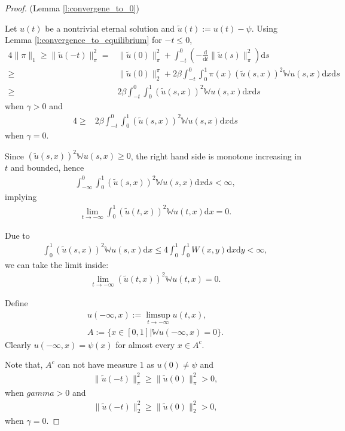\documentclass{article}
\renewcommand{\d}{\mathrm{d}}
\newcommand{\W}{\mathbb{W}}
\newcommand{\1}[1]{{\mathds{1}}_{\left\{#1\right\}}}
\begin{document}
\begin{proof}(Lemma \ref{l:convergene_to_0})
	
	Let $u(t)$ be a nontrivial eternal solution and $\tilde{u}(t):=u(t)-\psi.$ Using Lemma \ref{l:convergence_to_equilibrium} for $-t \leq 0$,
	\begin{align*}
		4 \|\pi \|_1 \geq \| \tilde{u}(-t) \|_{\pi}^2 =&\|\tilde{u}(0) \|_{\pi}^2+\int_{-t}^{0} \left(- \frac{\d}{\d t} \|\tilde{u}(s) \|_{\pi}^2 \right) \d s \\
		\geq &\|\tilde{u}(0) \|_2^{\pi}+2 \beta \int_{-t}^{0}  \int_{0}^{1} \pi(x) \left(\tilde{u}(s,x)\right)^2 \W u(s,x) \d x \d s \\
		\geq & 2 \beta \int_{-t}^{0}  \int_{0}^{1}  \left(\tilde{u}(s,x)\right)^2 \W u(s,x) \d x \d s
	\end{align*}
	when $\gamma>0$ and
	\begin{align*}
		4 \geq & 2 \beta \int_{-t}^{0}  \int_{0}^{1}  \left(\tilde{u}(s,x)\right)^2 \W u(s,x) \d x \d s
	\end{align*}
	when $\gamma=0$.
	
	Since $\left(\tilde{u}(s,x)\right)^2 \W u(s,x) \geq 0$, the right hand side is monotone increasing in $t$ and bounded, hence
	\begin{align*}
		\int_{-\infty}^{0}  \int_{0}^{1} \left(\tilde{u}(s,x)\right)^2 \W u(s,x) \d x \d s<\infty,
	\end{align*}
	implying
	\begin{align*}
		\lim_{t \to -\infty} \int_{0}^{1} \left(\tilde{u}(t,x) \right)^2 \W u(t,x) \d x=0.
	\end{align*}
	
	Due to
	\begin{align*}
		\int_{0}^{1} \left(\tilde{u}(s,x)\right)^2 \W u(s,x) \d x \leq 4\int_{0}^{1}\int_{0}^{1}W(x,y) \d x \d y <\infty,
	\end{align*}
	we can take the limit inside:
	\begin{align*}
		\lim_{t \to -\infty}\left(\tilde{u}(t,x)\right)^2 \W u(t,x)=0.
	\end{align*}
	
	Define
	\begin{align*}
		u(-\infty,x):=\limsup_{t \to -\infty}u(t,x), \\
		A:=\{ x \in [0,1] \left| \W u(-\infty,x)=0 \right.\}.
	\end{align*}
	Clearly $u(-\infty,x)=\psi(x)$ for almost every $x \in A^c.$
	
	Note that, $A^{c}$ can not have measure $1$ as $u(0) \neq \psi$ and
	\begin{align*}
		\|\tilde{u}(-t) \|_\pi^2  \geq \|\tilde{u}(0) \|_\pi^2>0,
	\end{align*}
	when $gamma>0$ and
	\begin{align*}
		\|\tilde{u}(-t) \|_2^2  \geq \|\tilde{u}(0) \|_2^2>0,
	\end{align*}
	 when $\gamma=0$.
	

\end{proof}
\end{document}
